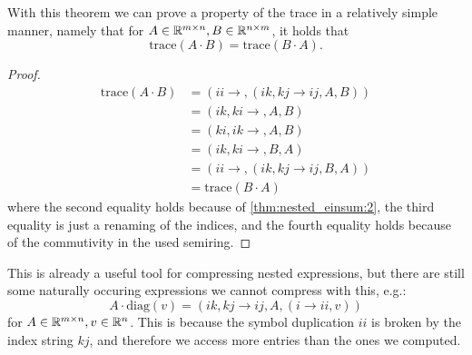 

With this theorem we can prove a property of the trace in a relatively simple manner, namely that for $A \in \mathbb{R}^{m \times n}, B \in \mathbb{R}^{n \times m}$,
it holds that
$$\text{trace}(A \cdot B) = \text{trace}(B \cdot A).$$

\begin{proof}
    \small
    \begin{align*}
        \text{trace}(A \cdot B) & = (ii \rightarrow , (ik,kj \rightarrow ij, A, B)) \\
                                & = (ik, ki \rightarrow ,A, B)                      \\
                                & = (ki, ik \rightarrow ,A, B)                      \\
                                & = (ik, ki \rightarrow ,B, A)                      \\
                                & = (ii \rightarrow , (ik,kj \rightarrow ij, B, A)) \\
                                & = \text{trace}(B \cdot A)
    \end{align*}
    where the second equality holds because of \autoref{thm:nested_einsum:2},
    the third equality is just a renaming of the indices,
    and the fourth equality holds because of the commutivity in the used semiring.
\end{proof}

This is already a useful tool for compressing nested expressions, but there are still some naturally occuring expressions we cannot compress with this,
e.g.:
$$A \cdot \text{diag}(v) = (ik, kj \rightarrow ij, A, (i \rightarrow ii, v))$$
for $A \in \mathbb{R}^{m \times n}, v \in \mathbb{R}^{n}$.
This is because the symbol duplication $ii$ is broken by the index string $kj$, and therefore we access more entries than the ones we computed.



